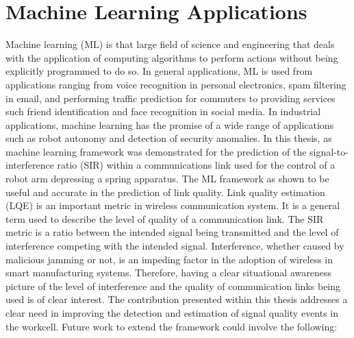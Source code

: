 \section{Machine Learning Applications}

Machine learning (ML) is that large field of science and engineering that deals with the application of computing algorithms to perform actions without being explicitly programmed to do so.  In general applications, ML is used from applications ranging from voice recognition in personal electronics, spam filtering in email, and performing traffic prediction for commuters to providing services such friend identification and face recognition in social media.  In industrial applications, machine learning has the promise of a wide range of applications such as robot autonomy and detection of security anomalies. In this thesis, as machine learning framework was demonstrated for the prediction of the signal-to-interference ratio (SIR) within a communications link used for the control of a robot arm depressing a spring apparatus.  The ML framework as shown to be useful and accurate in the prediction of link quality.  Link quality estimation (LQE) is an important metric in wireless communication system.  It is a general term used to describe the level of quality of a communication link.  The SIR metric is a ratio between the intended signal being transmitted and the level of interference competing with the intended signal.  Interference, whether caused by malicious jamming or not, is an impeding factor in the adoption of wireless in smart manufacturing systems.  Therefore, having a clear situational awareness picture of the level of interference and the quality of communication links being used is of clear interest.  The contribution presented within this thesis addresses a clear need in improving the detection and estimation of signal quality events in the workcell.  Future work to extend the framework could involve the following:

